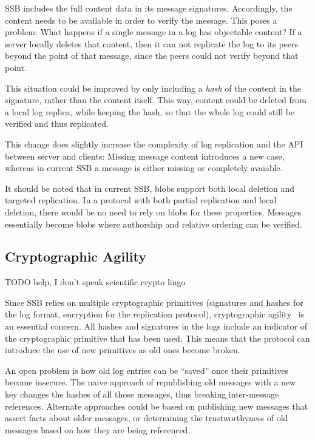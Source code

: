 \documentclass[sigconf]{acmart}
\begin{document}
SSB includes the full content data in its message signatures. Accordingly, the content needs to be available in order to verify the message. This poses a problem: What happens if a single message in a log has objectable content? If a server locally deletes that content, then it can not replicate the log to its peers beyond the point of that message, since the peers could not verify beyond that point.

This situation could be improved by only including a {\em hash} of the content in the signature, rather than the content itself. This way, content could be deleted from a local log replica, while keeping the hash, so that the whole log could still be verified and thus replicated.

This change does slightly increase the complexity of log replication and the API between server and clients: Missing message content introduces a new case, whereas in current SSB a message is either missing or completely avaiable.

It should be noted that in current SSB, blobs support both local deletion and targeted replication. In a protocol with both partial replication and local deletion, there would be no need to rely on blobs for these properties. Messages essentially become blobs where authorship and relative ordering can be verified.

\subsection{Cryptographic Agility}

TODO help, I don't speak scientific crypto lingo

Since SSB relies on multiple cryptographic primitives (signatures and hashes for the log format, encryption for the replication protocol), cryptographic agility~\cite{nelson2011crypto} is an essential concern. All hashes and signatures in the logs include an indicator of the cryptographic primitive that has been used. This means that the protocol can introduce the use of new primitives as old ones become broken.

An open problem is how old log entries can be ``saved'' once their primitives become insecure. The naive approach of republishing old messages with a new key changes the hashes of all those messages, thus breaking inter-message references. Alternate approaches could be based on publishing new messages that assert facts about older messages, or determining the trustworthyness of old messages based on how they are being referenced.
\end{document}
